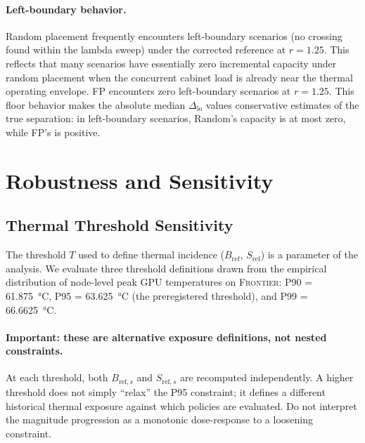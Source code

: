 \documentclass[acmsmall,screen,review,anonymous]{acmart}
\newcommand{\Frontier}{\textsc{Frontier}\xspace}
\newcommand{\dlo}{\ensuremath{\Delta_{\mathrm{lo}}}\xspace}
\begin{document}
\paragraph{Left-boundary behavior.}
Random placement frequently encounters left-boundary scenarios (no crossing found within
the lambda sweep) under the corrected reference at $r = 1.25$.  This reflects that many
scenarios have essentially zero incremental capacity under random placement when the
concurrent cabinet load is already near the thermal operating envelope.  FP encounters
zero left-boundary scenarios at $r = 1.25$.  This floor behavior makes the absolute
median $\dlo$ values conservative estimates of the true separation: in left-boundary
scenarios, Random's capacity is at most zero, while FP's is positive.


\section{Robustness and Sensitivity}
\label{sec:robustness}

\subsection{Thermal Threshold Sensitivity}
\label{sec:thresh}

The threshold $T$ used to define thermal incidence ($B_{\mathrm{ref}}$, $S_{\mathrm{ref}}$)
is a parameter of the analysis.  We evaluate three threshold definitions drawn from
the empirical distribution of node-level peak GPU temperatures on \Frontier:
P90 = \SI{61.875}{\celsius},
P95 = \SI{63.625}{\celsius} (the preregistered threshold), and
P99 = \SI{66.6625}{\celsius}.

\paragraph{Important: these are alternative exposure definitions, not nested constraints.}
At each threshold, both $B_{\mathrm{ref},s}$ and $S_{\mathrm{ref},s}$ are recomputed
independently.  A higher threshold does not simply ``relax'' the P95 constraint;
it defines a different historical thermal exposure against which policies are evaluated.
Do not interpret the magnitude progression as a monotonic dose-response to a loosening
constraint.
\end{document}
